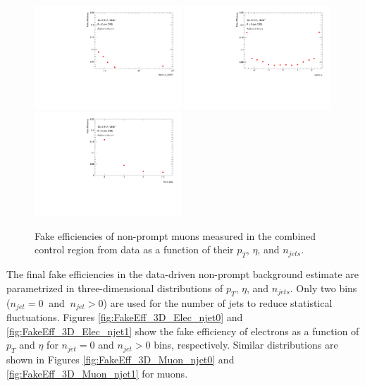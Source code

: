 \begin{figure}[!htbp]
        \begin{center}
        \includegraphics[width = 0.49\textwidth]{figures/Analysis/Background/Fake_Eff_Muon_pt_1D.pdf}
        \includegraphics[width = 0.49\textwidth]{figures/Analysis/Background/Fake_Eff_Muon_eta_1D.pdf} \\
        \includegraphics[width = 0.49\textwidth]{figures/Analysis/Background/Fake_Eff_Muon_jet_n_1D.pdf} 
        \end{center}
    \caption{Fake efficiencies of non-prompt muons measured in the combined control region from data as a function of their $p_{T}$, $\eta$, and $n_{jets}$. \label{fig:FakeEff_1D_Muon}}
\end{figure}

The final fake efficiencies in the data-driven non-prompt background estimate are parametrized in three-dimensional distributions of $p_{T}$, $\eta$, and $n_{jets}$. Only two bins ($n_{jet}=0 ~$ and $~ n_{jet} > 0$) are used for the number of jets to reduce statistical fluctuations. Figures \ref{fig:FakeEff_3D_Elec_njet0} and \ref{fig:FakeEff_3D_Elec_njet1} show the fake efficiency of electrons as a function of $p_{T}$ and $\eta$ for $n_{jet}=0 $ and $n_{jet}>0 $ bins, respectively. Similar distributions are shown in Figures \ref{fig:FakeEff_3D_Muon_njet0} and \ref{fig:FakeEff_3D_Muon_njet1} for muons. 

